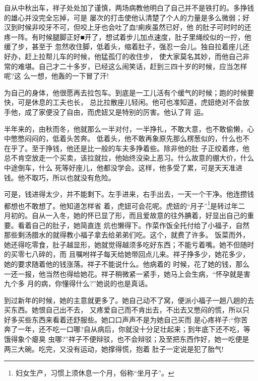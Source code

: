 \documentclass[11pt,a4paper,onecolumn]{article}
\begin{document}
自从中秋出车，祥子处处加了谨慎，两场病教他明白了自己并不是铁打的。多挣钱的雄心并没完全忘掉，可是
屡次的打击使他认清楚了个人的力量是多么微弱；好汉到时候非咬牙不可，但咬上牙也会吐了血!痢疾虽然已好，他
的肚子可时时的还疼一阵。有时候腿脚正好■开了，想试着步儿加点速度，肚子里绳绞似的一拧，他缓了步，甚至于
忽然收住脚，低着头，缩着肚子，强忍一会儿。独自拉着座儿还好办，赶上拉帮儿车的时候，他猛孤仃的收住步，
使大家莫名其妙，而他自己非常的难堪。自己才二十多岁，已经这么闹笑话，赶到三四十岁的时候，应当怎样呢?这
么一想，他轰的一下冒了汗!

为自己的身体，他很愿再去拉包车。到底是一工儿活有个缓气的时候；跑的时候要快，可是休息的工夫也长，
总比拉散座儿轻闲。他可也准知道，虎妞绝对不会放手他，成了家便没了自由，而虎妞又是特别的厉害。他认了背
运。

半年来的，由秋而冬，他就那么一半对付，一半挣扎，不敢大意，也不敢偷懒，心中憋憋闷闷的，低着头苦奔。
低着头，他不敢再象原先那么楞葱似的，什么也不在乎了。至于挣钱，他还是比一般的车夫多挣着些。除非他的肚
子正绞着疼，他总不肯空放走一个买卖，该拉就拉，他始终没染上恶习。什么故意的绷大价，什么中途倒车，什么
死等好座儿，他都没学会。这样，他多受了累，可是天天准进钱。他不取巧，所以也就没有危险。

可是，钱进得太少，并不能剩下。左手进来，右手出去，一天一个干净。他连攒钱都想也不敢想了。他知道怎样省
着，虎妞可会花呢。虎妞的``月子''\footnote{妇女生产，习惯上须休息一个月，俗称``坐月子''。}是转过年二
月初的。自从一入冬，她的怀已显了形，而且爱故意的往外腆着，好显出自己的重要。看着自己的肚子，她简直连
炕也懒得下。作菜作饭全托付给了小福子，自然那些剩汤腊水的就得教小福子拿去给弟弟们吃。这个，就费了许多。
饭菜而外，她还得吃零食，肚子越显形，她就觉得越须多吃好东西；不能亏着嘴。她不但随时的买零七八碎的，而
且嘱咐祥子每天给她带回点儿来。祥子挣多少，她花多少，她的要求随着他的钱涨落。祥子不能说什么。他病着的
时候，花了她的钱，那么一还一报，他当然也得给她花。祥子稍微紧一紧手，她马上会生病，``怀孕就是害九个多
月的病，你懂得什么?''她说的也是真话。

到过新年的时候，她的主意就更多了。她自己动不了窝，便派小福子一趟八趟的去买东西。她恨自己出不去，
又疼爱自己而不肯出去，不出去又憋闷的慌，所以只好多买些东西来看着还舒服些。她口口声声不是为她自己买而
是心疼祥子:``你苦奔了一年，还不吃一口哪?自从病后，你就没十分足壮起来；到年底下还不吃，等饿得象个瘪臭
虫哪?''祥子不便辩驳，也不会辩驳；及至把东西作好，她一吃便是两三大碗。吃完，又没有运动，她撑得慌，抱着
肚子一定说是犯了胎气!
\end{document}
